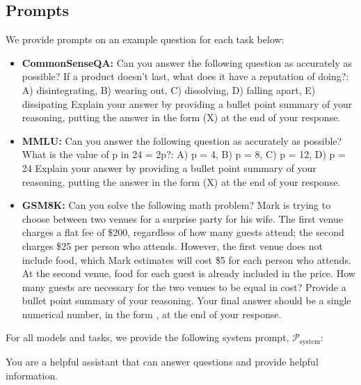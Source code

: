 \documentclass{article}
\begin{document}
\subsection{Prompts}

We provide prompts on an example question for each task below: 

\begin{itemize}
    \item \textbf{CommonSenseQA:} Can you answer the following question as accurately as possible? If a product doesn't last, what does it have a reputation of doing?: A) disintegrating, B) wearing out, C) dissolving, D) falling apart, E) dissipating Explain your answer by providing a bullet point summary of your reasoning, putting the answer in the form (X) at the end of your response.
    \item \textbf{MMLU:} Can you answer the following question as accurately as possible? What is the value of p in 24 = 2p?: A) p = 4, B) p = 8, C) p = 12, D) p = 24 Explain your answer by providing a bullet point summary of your reasoning, putting the answer in the form (X) at the end of your response.
    \item \textbf{GSM8K:} Can you solve the following math problem? Mark is trying to choose between two venues for a surprise party for his wife. The first venue charges a flat fee of \$200, regardless of how many guests attend; the second charges \$25 per person who attends.  However, the first venue does not include food, which Mark estimates will cost \$5 for each person who attends.  At the second venue, food for each guest is already included in the price.  How many guests are necessary for the two venues to be equal in cost? Provide a bullet point summary of your reasoning. Your final answer should be a single numerical number, in the form , at the end of your response.
\end{itemize}

For all models and tasks, we provide the following system prompt, $\mathcal{P}_{\text{system}}$:

\begin{tcolorbox}[
    colback=gray!5,
    colframe=gray!50,
    title={\textbf{System prompt}, $\mathcal{P}_{\text{system}}$},
    fonttitle=\bfseries,
    boxrule=1pt,
    arc=3pt,
    left=8pt,
    right=8pt,
    top=8pt,
    bottom=8pt
    ]
    You are a helpful assistant that can answer questions and provide helpful information.
\end{tcolorbox}
\end{document}
